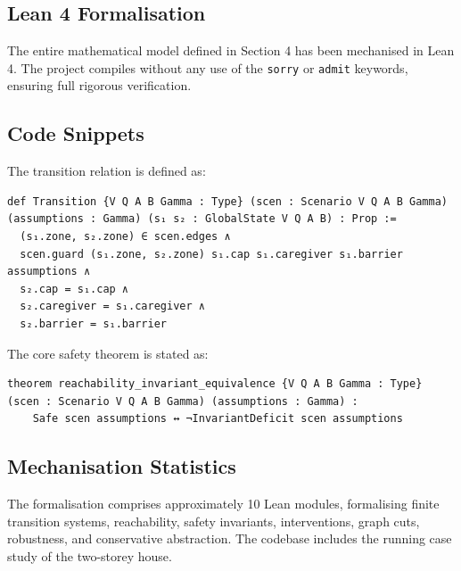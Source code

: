 \subsection{Lean 4 Formalisation}
The entire mathematical model defined in Section 4 has been mechanised in Lean 4. The project compiles without any use of the \texttt{sorry} or \texttt{admit} keywords, ensuring full rigorous verification.

\subsection{Code Snippets}
The transition relation is defined as:
\begin{lstlisting}[language=Lean]
def Transition {V Q A B Gamma : Type} (scen : Scenario V Q A B Gamma) (assumptions : Gamma) (s₁ s₂ : GlobalState V Q A B) : Prop :=
  (s₁.zone, s₂.zone) ∈ scen.edges ∧
  scen.guard (s₁.zone, s₂.zone) s₁.cap s₁.caregiver s₁.barrier assumptions ∧
  s₂.cap = s₁.cap ∧
  s₂.caregiver = s₁.caregiver ∧
  s₂.barrier = s₁.barrier
\end{lstlisting}

The core safety theorem is stated as:
\begin{lstlisting}[language=Lean]
theorem reachability_invariant_equivalence {V Q A B Gamma : Type} (scen : Scenario V Q A B Gamma) (assumptions : Gamma) :
    Safe scen assumptions ↔ ¬InvariantDeficit scen assumptions
\end{lstlisting}

\subsection{Mechanisation Statistics}
The formalisation comprises approximately 10 Lean modules, formalising finite transition systems, reachability, safety invariants, interventions, graph cuts, robustness, and conservative abstraction. The codebase includes the running case study of the two-storey house.
